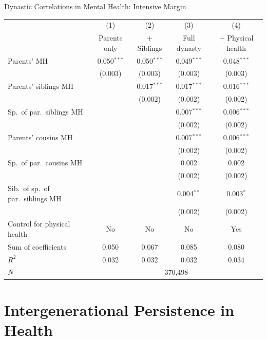 \documentclass[aspectratio=169]{beamer}
\begin{document}
\begin{frame}{Dynastic Correlations in Mental Health: Intensive Margin}
\scriptsize
\begin{tabular}{lcccc}
\toprule
 & (1) & (2) & (3) & (4) \\
 & Parents only & $+$ Siblings & Full dynasty & $+$ Physical health \\
\midrule
Parents' MH
  & 0.050$^{***}$ & 0.050$^{***}$ & 0.049$^{***}$ & 0.048$^{***}$ \\
  & (0.003) & (0.003) & (0.003) & (0.003) \\
Parents' siblings MH
  & & 0.017$^{***}$ & 0.017$^{***}$ & 0.016$^{***}$ \\
  & & (0.002) & (0.002) & (0.002) \\
Sp.\ of par.\ siblings MH
  & & & 0.007$^{***}$ & 0.006$^{***}$ \\
  & & & (0.002) & (0.002) \\
Parents' cousins MH
  & & & 0.007$^{***}$ & 0.006$^{***}$ \\
  & & & (0.002) & (0.002) \\
Sp.\ of par.\ cousins MH
  & & & 0.002 & 0.002 \\
  & & & (0.002) & (0.002) \\
Sib.\ of sp.\ of par.\ siblings MH
  & & & 0.004$^{**}$ & 0.003$^{*}$ \\
  & & & (0.002) & (0.002) \\
\midrule
Control for physical health & No & No & No & Yes \\
Sum of coefficients & 0.050 & 0.067 & 0.085 & 0.080 \\
$R^2$ & 0.032 & 0.032 & 0.032 & 0.034 \\
$N$ & \multicolumn{4}{c}{370,498} \\
\bottomrule
\end{tabular}
\end{frame}
\section{Intergenerational Persistence in Health}
\end{document}
